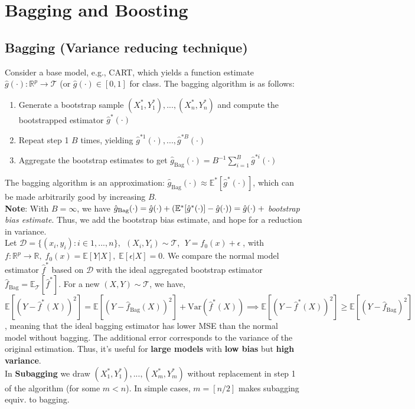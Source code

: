 \section{Bagging and Boosting}
\subsection*{Bagging (Variance reducing technique)}
Consider a base model, e.g., CART, which yields a function estimate $\hat{g}(\cdot) \colon \mathbb{R}^p \to \mathcal{T}$ (or $\hat{g}(\cdot) \in [0,1]$ for class. The bagging algorithm is as follows:
\begin{enumerate}
    \item Generate a bootstrap sample $(X^*_1, Y^*_1),...,(X^*_n,Y^*_n)$ and compute the bootstrapped estimator $\hat{g}^*(\cdot)$
    \item  Repeat step 1 $B$ times, yielding $\hat{g}^{*1}(\cdot), ..., \hat{g}^{*B}(\cdot)$
    \item Aggregate the bootstrap estimates to get $\hat{g}_{\text{Bag}}(\cdot) = B^{-1} \sum_{i=1}^B \hat{g}^{*i}(\cdot)$
\end{enumerate}
The bagging algorithm is an approximation: $\hat{g}_{\text{Bag}}(\cdot) \approx \mathbb{E}^*[\hat{g}^*(\cdot)]$, which can be made arbitrarily good by increasing $B$. \\ 
\textbf{Note}: With $B = \infty$, we have $\hat{g}_{\text{Bag}}(\cdot) = \hat{g}(\cdot) + (\mathbb{E}^*[\hat{g}^*(\cdot)] - \hat{g}(\cdot)) \\
= \hat{g}(\cdot) \; +$ \textit{bootstrap bias estimate}. Thus, we add the bootstrap bias estimate, and hope for a reduction in variance. \\
Let $\mathcal{D} = \{ (x_i, y_i) \colon i \in 1,...,n \}$, $\; (X_i, Y_i) \sim \mathcal{T}$, $\; Y = f_0(x) + \epsilon \;$, with \\
$f \colon \mathbb{R}^p \to \mathbb{R}, \; f_0(x) = \mathbb{E}[Y|X], \; \mathbb{E}[\epsilon|X]=0$. We compare the normal model estimator $\hat{f}^*$ based on $\mathcal{D}$ with the ideal aggregated bootstrap estimator $\hat{f}_{\text{Bag}} = \mathbb{E}_\mathcal{T}[\hat{f}^*]$. For a new $(X, Y) \sim \mathcal{T}$, we have, $\mathbb{E}[(Y-\hat{f}^*(X))^2] = \mathbb{E}[(Y-\hat{f}_{\text{Bag}}(X))^2] + \text{Var}(\hat{f}^*(X)) \implies \mathbb{E}[(Y-\hat{f}^*(X))^2] \geq \mathbb{E}[(Y-\hat{f}_\text{Bag})^2]$, meaning that the ideal bagging estimator has lower MSE than the normal model without bagging. The additional error corresponds to the variance of the original estimation. Thus, it's useful for \textbf{large models} with \textbf{low bias} but \textbf{high variance}. \\
In \textbf{Subagging} we draw $(X_1^*,Y_1^*),...,(X_m^*,Y_m^*)$ without replacement in step 1 of the algorithm (for some $m < n$). In simple cases, $m = [n/2]$ makes subagging equiv. to bagging.\\

